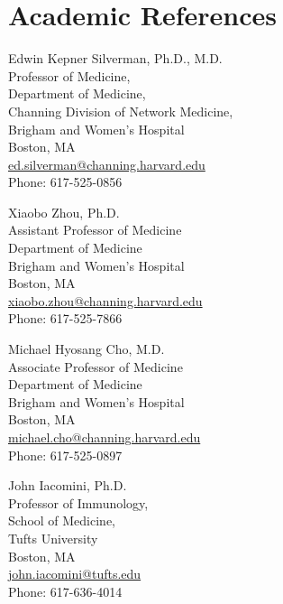 \documentclass[letterpaper, 10pt]{article}
\begin{document}
\section*{Academic References}
\begin{minipage}[ht]{.50\textwidth}
Edwin Kepner Silverman, Ph.D., M.D. \\
Professor of Medicine, \\
Department of Medicine, \\
Channing Division of Network Medicine, \\
Brigham and Women's Hospital \\
Boston, MA \\
\href{mailto:ed.silverman@channing.harvard.edu}{ed.silverman@channing.harvard.edu} \\
Phone: 617-525-0856
\vspace{4ex}
\end{minipage}
\begin{minipage}[ht]{.50\textwidth}
Xiaobo Zhou, Ph.D. \\
Assistant Professor of Medicine \\
Department of Medicine \\
Brigham and Women's Hospital \\
Boston, MA \\
\href{mailto:xiaobo.zhou@channing.harvard.edu}{xiaobo.zhou@channing.harvard.edu} \\
Phone: 617-525-7866
\vspace{4ex}
\end{minipage}
\begin{minipage}[ht]{.50\textwidth}
Michael Hyosang Cho, M.D. \\
Associate Professor of Medicine \\
Department of Medicine \\
Brigham and Women's Hospital \\
Boston, MA \\
\href{mailto:michael.cho@channing.harvard.edu}{michael.cho@channing.harvard.edu} \\
Phone: 617-525-0897
\end{minipage}
\begin{minipage}[ht]{.50\textwidth}
John Iacomini, Ph.D. \\
Professor of Immunology, \\
School of Medicine, \\
Tufts University \\
Boston, MA \\
\href{mailto:john.iacomini@tufts.edu}{john.iacomini@tufts.edu} \\
Phone: 617-636-4014
\end{minipage}
\end{document}
